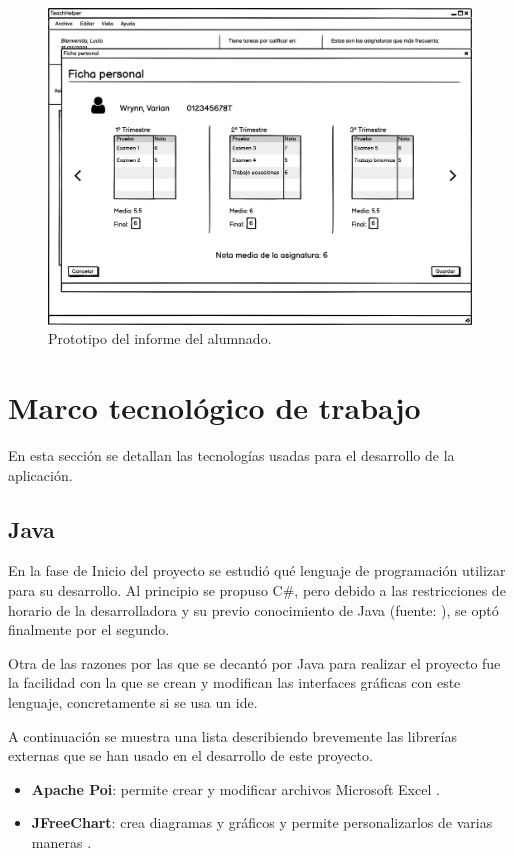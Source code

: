 \begin{figure}[h]
\centering\includegraphics[width=1\linewidth]{figs/mockup_informealumno.png}
\caption{Prototipo del informe del alumnado.}
\label{Fig:mockup_informealumno}
\end{figure}


\section{Marco tecnológico de trabajo}

En esta sección se detallan las tecnologías usadas para el desarrollo de la aplicación.

\subsection{Java}
En la fase de Inicio del proyecto se estudió qué lenguaje de programación utilizar para su desarrollo. Al principio se propuso C\#, pero debido a las restricciones de horario de la desarrolladora y su previo conocimiento de Java (fuente: \cite{java}), se optó finalmente por el segundo.

Otra de las razones por las que se decantó por Java para realizar el proyecto fue la facilidad con la que se crean y modifican las interfaces gráficas con este lenguaje, concretamente si se usa un \gls{ide}.

A continuación se muestra una lista describiendo brevemente las librerías externas que se han usado en el desarrollo de este proyecto.
\begin{itemize}
	\item \textbf{Apache Poi}: permite crear y modificar archivos Microsoft Excel \cite{apachepoi}.
	\item \textbf{JFreeChart}: crea diagramas y gráficos y permite personalizarlos de varias maneras \cite{jfreechart}.
\end{itemize}


